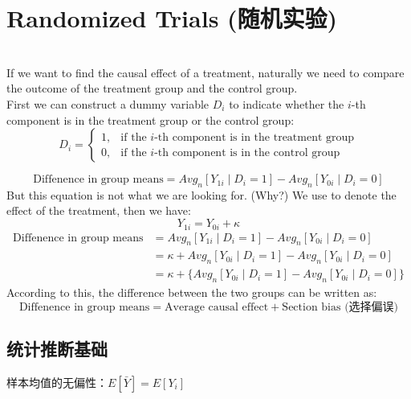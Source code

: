 \documentclass[10pt, a4paper]{article}
\begin{document}
\section{Randomized Trials (随机实验)} 
 \\

If we want to find the causal effect of a treatment, naturally we need to compare the outcome of the treatment group and the control group.\\
First we can construct a dummy variable $D_i$ to indicate whether the $i$-th component is in the treatment group or the control group:
\[D_i = \begin{cases}
1, & \text{if the $i$-th component is in the treatment group} \\
0, & \text{if the $i$-th component is in the control group}
\end{cases}\]

\[\text{Diffenence in group means} = Avg_n[Y_{1i} \mid D_i = 1] - Avg_n[Y_{0i} \mid D_i = 0] \]
But this equation is not what we are looking for. (Why?) We use \kappa to denote the effect of the treatment, then we have:
\[ Y_{1i} = Y_{0i} + \kappa \]
\begin{align*}
    \text{Diffenence in group means} &= Avg_n[Y_{1i} \mid D_i = 1] - Avg_n[Y_{0i} \mid D_i = 0] \\
    &= {\kappa + Avg_n[Y_{0i} \mid D_i = 1]} - Avg_n[Y_{0i} \mid D_i = 0] \\
    &= \kappa + \{Avg_n[Y_{0i} \mid D_i = 1] - Avg_n[Y_{0i} \mid D_i = 0]\}
\end{align*}
According to this, the difference between the two groups can be written as:
\[\boxed{\text{Diffenence in group means} = \text{Average causal effect} + \text{Section bias (选择偏误)}}\]  

\subsection{统计推断基础}
样本均值的无偏性：$E[\bar{Y}] = E[Y_i]$
\end{document}
